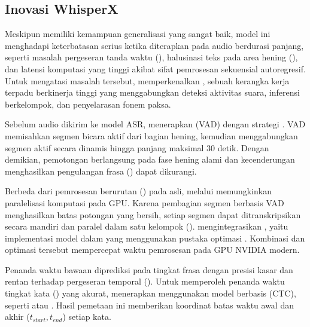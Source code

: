 \subsection{Inovasi  WhisperX}
Meskipun  memiliki kemampuan generalisasi yang sangat baik, model ini menghadapi keterbatasan serius ketika diterapkan pada audio berdurasi panjang, seperti masalah pergeseran tanda waktu (), halusinasi teks pada area hening (), dan latensi komputasi yang tinggi akibat sifat pemrosesan sekuensial autoregresif. Untuk mengatasi masalah tersebut, \citet{bain_whisperx_2023} memperkenalkan , sebuah kerangka kerja terpadu berkinerja tinggi yang menggabungkan deteksi aktivitas suara, inferensi berkelompok, dan penyelarasan fonem paksa.

Sebelum audio dikirim ke model ASR,  menerapkan  (VAD) dengan strategi . VAD memisahkan segmen bicara aktif dari bagian hening, kemudian menggabungkan segmen aktif secara dinamis hingga panjang maksimal 30 detik. Dengan demikian, pemotongan berlangsung pada fase hening alami dan kecenderungan  menghasilkan pengulangan frasa () dapat dikurangi.

Berbeda dari pemrosesan berurutan () pada  asli,  melalui  memungkinkan paralelisasi komputasi pada GPU. Karena pembagian segmen berbasis VAD menghasilkan batas potongan yang bersih, setiap segmen dapat ditranskripsikan secara mandiri dan paralel dalam satu kelompok ().  mengintegrasikan , yaitu implementasi model  dalam  yang menggunakan pustaka optimasi . Kombinasi  dan optimasi tersebut mempercepat waktu pemrosesan pada GPU NVIDIA modern.

Penanda waktu bawaan  diprediksi pada tingkat frasa dengan presisi kasar dan rentan terhadap pergeseran temporal (). Untuk memperoleh penanda waktu tingkat kata () yang akurat,  menerapkan  menggunakan model berbasis  (CTC), seperti  atau . Hasil pemetaan ini memberikan koordinat batas waktu awal dan akhir ($t_{start}, t_{end}$) setiap kata.

